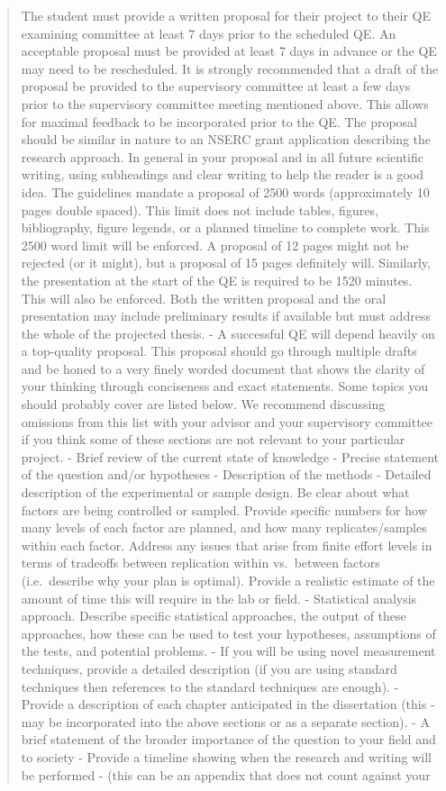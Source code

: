 \documentclass[10pt,oneside]{article}
\begin{document}
\begin{quote}
The student must provide a written proposal for their project to their
QE examining committee at least 7 days prior to the scheduled QE. An
acceptable proposal must be provided at least 7 days in advance or the
QE may need to be rescheduled. It is strongly recommended that a draft
of the proposal be provided to the supervisory committee at least a few
days prior to the supervisory committee meeting mentioned above. This
allows for maximal feedback to be incorporated prior to the QE. The
proposal should be similar in nature to an NSERC grant application
describing the research approach. In general in your proposal and in all
future scientific writing, using subheadings and clear writing to help
the reader is a good idea. The guidelines mandate a proposal of 2500
words (approximately 10 pages double spaced). This limit does not
include tables, figures, bibliography, figure legends, or a planned
timeline to complete work. This 2500 word limit will be enforced. A
proposal of 12 pages might not be rejected (or it might), but a proposal
of 15 pages definitely will. Similarly, the presentation at the start of
the QE is required to be 1520 minutes. This will also be enforced. Both
the written proposal and the oral presentation may include preliminary
results if available but must address the whole of the projected thesis.
- A successful QE will depend heavily on a top-quality proposal. This
proposal should go through multiple drafts and be honed to a very finely
worded document that shows the clarity of your thinking through
conciseness and exact statements. Some topics you should probably cover
are listed below. We recommend discussing omissions from this list with
your advisor and your supervisory committee if you think some of these
sections are not relevant to your particular project. - Brief review of
the current state of knowledge - Precise statement of the question
and/or hypotheses - Description of the methods - Detailed description of
the experimental or sample design. Be clear about what factors are being
controlled or sampled. Provide specific numbers for how many levels of
each factor are planned, and how many replicates/samples within each
factor. Address any issues that arise from finite effort levels in terms
of tradeoffs between replication within vs.~between factors
(i.e.~describe why your plan is optimal). Provide a realistic estimate
of the amount of time this will require in the lab or field. -
Statistical analysis approach. Describe specific statistical approaches,
the output of these approaches, how these can be used to test your
hypotheses, assumptions of the tests, and potential problems. - If you
will be using novel measurement techniques, provide a detailed
description (if you are using standard techniques then references to the
standard techniques are enough). - Provide a description of each chapter
anticipated in the dissertation (this - may be incorporated into the
above sections or as a separate section). - A brief statement of the
broader importance of the question to your field and to society -
Provide a timeline showing when the research and writing will be
performed - (this can be an appendix that does not count against your
\end{quote}
\end{document}
